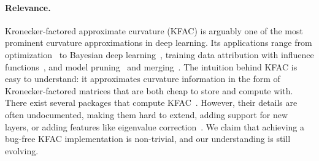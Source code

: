 \paragraph{Relevance.} Kronecker-factored approximate curvature (KFAC) is arguably one of the most prominent curvature approximations in deep learning.
Its applications range from optimization~\cite{martens2015optimizing,grosse2016kroneckerfactored,eschenhagen2023kroneckerfactored,benzing2022gradient,petersen2023isaac} to Bayesian deep learning~\cite{daxberger2021laplace}, training data attribution with influence functions~\cite{grosse2023studying,bae2024training}, and model pruning~\cite{wang2019eigendamage} and merging~\cite{tam2024merging}.
The intuition behind KFAC is easy to understand: it approximates curvature information in the form of Kronecker-factored matrices that are both cheap to store and compute with.
There exist several packages that compute KFAC~\cite{botev2022kfac-jax,dangel2020backpack,osawa2023asdl,grosse2023studying}.
However, their details are often undocumented, making them hard to extend, \eg adding support for new layers, or adding features like eigenvalue correction~\cite{george2018fast}.
We claim that achieving a bug-free KFAC implementation is non-trivial, and our understanding is still evolving.


